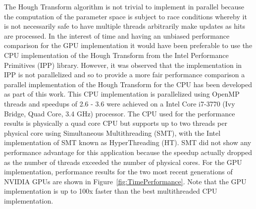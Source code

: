 \documentclass{JINST}
\begin{document}
The Hough Transform algorithm is not trivial to implement in parallel because the computation of the parameter space is subject to race
conditions whereby it is not necessarily safe to have multiple threads arbitrarily make updates as hits are processed.  In the interest of time
and having an unbiased performance comparison for the GPU implementation it would have been preferable to use the CPU implementation of the Hough Transform 
from the Intel Performance Primitives (IPP) library.  However, it was observed that the implementation in IPP is not parallelized and so to provide a more 
fair performance comparison a parallel implementation of the Hough Transform for the CPU has been developed as part of this work.  This CPU implementation is
 parallelized using OpenMP threads and speedups of 2.6 - 3.6 were achieved on a Intel Core i7-3770 (Ivy Bridge, Quad Core, 3.4 GHz) processor.  The CPU used 
for the performance results is physically a quad core CPU but supports up to two threads per physical core using Simultaneous Multithreading (SMT), 
with the Intel implementation of SMT known as HyperThreading (HT).  SMT did not show any performance advantage for this application because the speedup
 actually dropped as the number of threads exceeded the number of physical cores.  For the GPU implementation, performance results for the two most recent 
generations of NVIDIA GPUs are shown in Figure~\ref{fig:TimePerformance}.  Note that the GPU implementation is up to 100x faster than the best multithreaded CPU implementation.
\end{document}
